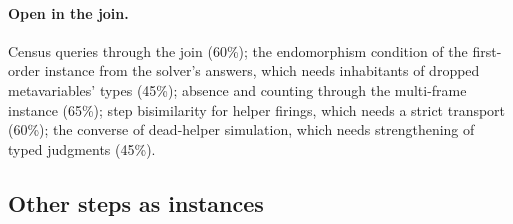 \documentclass[11pt]{article}
\theoremstyle{remark}
\begin{document}
\paragraph{Open in the join.} Census queries through the join (60\%); the endomorphism condition of
the first-order instance from the solver's answers, which needs inhabitants of dropped metavariables'
types (45\%); absence and counting through the multi-frame instance (65\%); step bisimilarity for
helper firings, which needs a strict transport (60\%); the converse of dead-helper simulation, which
needs strengthening of typed judgments (45\%).

\subsection{Other steps as instances}
\end{document}
